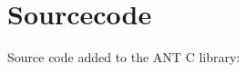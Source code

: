 \chapter{Sourcecode}


\newpage

\newpage

\newpage
Source code added to the ANT C library\cite{ANTPICLIB}:


